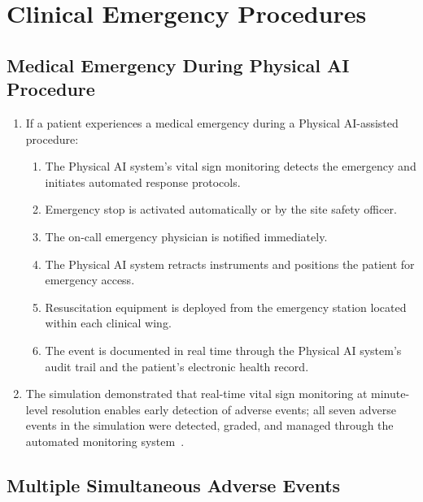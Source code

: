 \documentclass[11pt,letterpaper]{article}
\begin{document}
\section{Clinical Emergency Procedures}

\subsection{Medical Emergency During Physical AI Procedure}

\begin{enumerate}[label=(\alph*)]
\item If a patient experiences a medical emergency during a Physical AI-assisted
  procedure:
  \begin{enumerate}[label=(\arabic*)]
  \item The Physical AI system's vital sign monitoring detects the emergency
    and initiates automated response protocols.
  \item Emergency stop is activated automatically or by the site safety officer.
  \item The on-call emergency physician is notified immediately.
  \item The Physical AI system retracts instruments and positions the patient
    for emergency access.
  \item Resuscitation equipment is deployed from the emergency station located
    within each clinical wing.
  \item The event is documented in real time through the Physical AI system's
    audit trail and the patient's electronic health record.
  \end{enumerate}

\item The simulation demonstrated that real-time vital sign monitoring at
  minute-level resolution enables early detection of adverse events; all
  seven adverse events in the simulation were detected, graded, and managed
  through the automated monitoring
  system~\cite{newtrial2026}.
\end{enumerate}

\subsection{Multiple Simultaneous Adverse Events}
\end{document}
